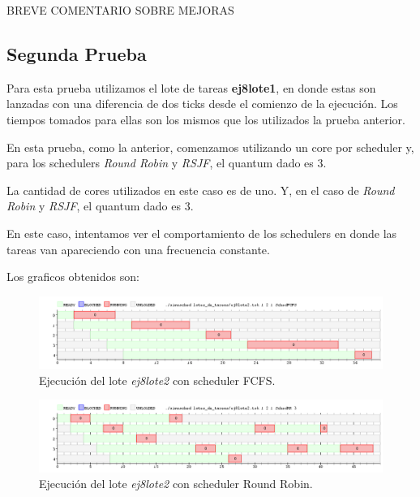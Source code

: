 BREVE COMENTARIO SOBRE MEJORAS

\subsection{Segunda Prueba}

Para esta prueba utilizamos el lote de tareas \textbf{ej8lote1}, en donde estas son lanzadas con una diferencia de dos ticks desde el comienzo de la ejecución. Los tiempos tomados para ellas son los mismos que los utilizados la prueba anterior.

En esta prueba, como la anterior, comenzamos utilizando un core por scheduler y, para los schedulers \emph{Round Robin} y \emph{RSJF}, el quantum dado es 3.

La cantidad de cores utilizados en este caso es de uno. Y, en el caso de \emph{Round Robin} y \emph{RSJF}, el quantum dado es 3.

En este caso, intentamos ver el comportamiento de los schedulers en donde las tareas van apareciendo con una frecuencia constante.

Los graficos obtenidos son:

\begin{figure}[!h]
	\begin{center}
		\includegraphics[width=500px]{imagenes/ej8_prueba2_fcfs.png}
		\caption{Ejecución del lote \emph{ej8lote2} con scheduler FCFS.}
		\label{fig:grafico_ej8_prueba2_fcfs}
	\end{center}
\end{figure}

\begin{figure}[!h]
	\begin{center}
		\includegraphics[width=500px]{imagenes/ej8_prueba2_rr.png}
		\caption{Ejecución del lote \emph{ej8lote2} con scheduler Round Robin.}
		\label{fig:grafico_ej8_prueba2_rr}
	\end{center}
\end{figure}


